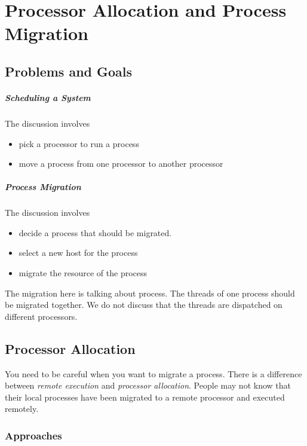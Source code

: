 %
%
%

\chapter{Processor Allocation and Process Migration}

\section{Problems and Goals}
\paragraph{Scheduling a System}
The discussion involves
\begin{itemize}
    \item pick a processor to run a process
    \item move a process from one processor to another processor
\end{itemize}

\paragraph{Process Migration}
The discussion involves
\begin{itemize}
    \item decide a process that should be migrated.
    \item select a new host for the process
    \item migrate the resource of the process
\end{itemize}

The migration here is talking about process. The threads of one process should be migrated together. We do not discuss that the threads are dispatched on different processors.

\section{Processor Allocation}
You need to be careful when you want to migrate a process. There is a difference between \emph{remote execution} and \emph{processor allocation}. People may not know that their local processes have been migrated to a remote processor and executed remotely.

\subsection{Approaches}

